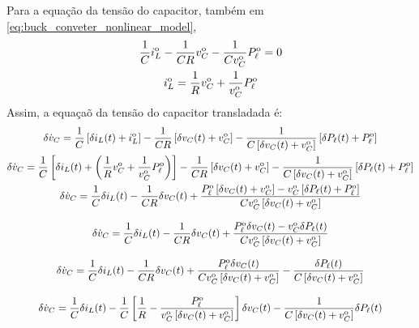 Para a equação da tensão do capacitor, também em  \eqref{eq:buck_conveter_nonlinear_model},
\begin{gather}
  \frac{1}{C} i_L^{\rm o} - \frac{1}{C R} v_C^{\rm o} - \frac{1}{C v_C^{\rm o}} P_{\ell}^{\rm o} = 0 \\
  i_L^{\rm o} = \frac{1}{R} v_C^{\rm o} + \frac{1}{v_C^{\rm o}} P_{\ell}^{\rm o}
\end{gather}
Assim, a equaçaõ da tensão do capacitor transladada é:
\begin{gather}
  \delta \dot v_C = \frac{1}{C} \left[\delta i_L(t) + i_L^{\rm o}\right]
  - \frac{1}{C R} \left[\delta v_C(t) + v_C^{\rm o} \right]
  - \frac{1}{C \left[\delta v_C(t) + v_C^{\rm o}\right]} \left[\delta P_{\ell}(t) + P_{\ell}^{\rm o}\right] \\
  \delta \dot v_C = \frac{1}{C} \left[\delta i_L(t) + \left(\frac{1}{R} v_C^{\rm o} + \frac{1}{v_C^{\rm o}} P_{\ell}^{\rm o}\right) \right]
  - \frac{1}{C R} \left[\delta v_C(t) + v_C^{\rm o} \right]
  - \frac{1}{C \left[\delta v_C(t) + v_C^{\rm o}\right]} \left[\delta P_{\ell}(t) + P_{\ell}^{\rm o}\right] \\
  \delta \dot v_C = \frac{1}{C} \delta i_L(t) - \frac{1}{C R} \delta v_C(t)
  + \frac{P_{\ell}^{\rm o} \left[\delta v_C(t) + v_C^{\rm o}\right] - v_C^{\rm o}\left[\delta P_{\ell}(t) + P_{\ell}^{\rm o}\right]}{C v_C^{\rm o} \left[\delta v_C(t) + v_C^{\rm o}\right]}  \\[8pt]
  \delta \dot v_C = \frac{1}{C} \delta i_L(t) - \frac{1}{C R} \delta v_C(t)
  + \frac{P_{\ell}^{\rm o} \delta v_C(t) - v_C^{\rm o}\delta P_{\ell}(t)}{C v_C^{\rm o} \left[\delta v_C(t) + v_C^{\rm o}\right]} \\[8pt]
  \delta \dot v_C = \frac{1}{C} \delta i_L(t) - \frac{1}{C R} \delta v_C(t)
  + \frac{P_{\ell}^{\rm o} \delta v_C(t)}{C v_C^{\rm o} \left[\delta v_C(t) + v_C^{\rm o}\right]} - \frac{\delta P_{\ell}(t)}{C \left[\delta v_C(t) + v_C^{\rm o}\right]} \\[8pt]
  \delta \dot v_C = \frac{1}{C} \delta i_L(t) - \frac{1}{C}\left[\frac{1}{R} - \frac{P_{\ell}^{\rm o}}{v_C^{\rm o} \left[\delta v_C(t) + v_C^{\rm o}\right]}\right] \delta v_C(t)
  - \frac{1}{C \left[\delta v_C(t) + v_C^{\rm o}\right]} \delta P_{\ell}(t)
\end{gather}

